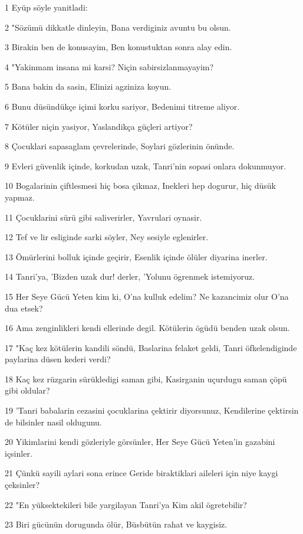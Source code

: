 \par 1 Eyüp söyle yanitladi:
\par 2 "Sözümü dikkatle dinleyin, Bana verdiginiz avuntu bu olsun.
\par 3 Birakin ben de konusayim, Ben konustuktan sonra alay edin.
\par 4 "Yakinmam insana mi karsi? Niçin sabirsizlanmayayim?
\par 5 Bana bakin da sasin, Elinizi agziniza koyun.
\par 6 Bunu düsündükçe içimi korku sariyor, Bedenimi titreme aliyor.
\par 7 Kötüler niçin yasiyor, Yaslandikça güçleri artiyor?
\par 8 Çocuklari sapasaglam çevrelerinde, Soylari gözlerinin önünde.
\par 9 Evleri güvenlik içinde, korkudan uzak, Tanri'nin sopasi onlara dokunmuyor.
\par 10 Bogalarinin çiftlesmesi hiç bosa çikmaz, Inekleri hep dogurur, hiç düsük yapmaz.
\par 11 Çocuklarini sürü gibi saliverirler, Yavrulari oynasir.
\par 12 Tef ve lir esliginde sarki söyler, Ney sesiyle eglenirler.
\par 13 Ömürlerini bolluk içinde geçirir, Esenlik içinde ölüler diyarina inerler.
\par 14 Tanri'ya, 'Bizden uzak dur! derler, 'Yolunu ögrenmek istemiyoruz.
\par 15 Her Seye Gücü Yeten kim ki, O'na kulluk edelim? Ne kazancimiz olur O'na dua etsek?
\par 16 Ama zenginlikleri kendi ellerinde degil. Kötülerin ögüdü benden uzak olsun.
\par 17 "Kaç kez kötülerin kandili söndü, Baslarina felaket geldi, Tanri öfkelendiginde paylarina düsen kederi verdi?
\par 18 Kaç kez rüzgarin sürükledigi saman gibi, Kasirganin uçurdugu saman çöpü gibi oldular?
\par 19 'Tanri babalarin cezasini çocuklarina çektirir diyorsunuz, Kendilerine çektirsin de bilsinler nasil oldugunu.
\par 20 Yikimlarini kendi gözleriyle görsünler, Her Seye Gücü Yeten'in gazabini içsinler.
\par 21 Çünkü sayili aylari sona erince Geride biraktiklari aileleri için niye kaygi çeksinler?
\par 22 "En yüksektekileri bile yargilayan Tanri'ya Kim akil ögretebilir?
\par 23 Biri gücünün dorugunda ölür, Büsbütün rahat ve kaygisiz.
